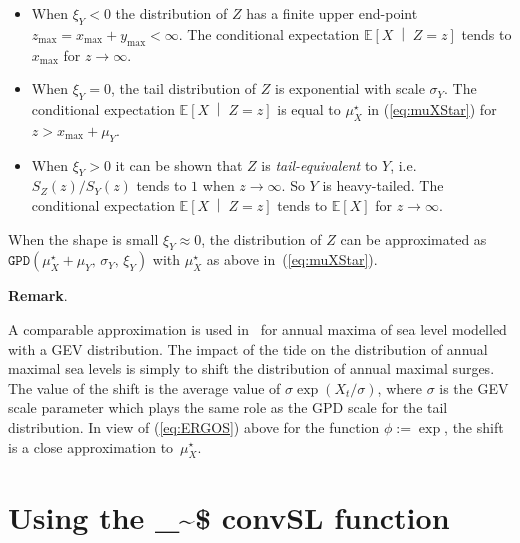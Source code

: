 \documentclass[11pt,a4paper]{report}\usepackage[]{graphicx}\usepackage[]{color}
\makeatletter
\newcommand\code{\bgroup\@makeother\_\@makeother\~\@makeother\$\@codex}
\def\@codex#1{{\normalfont\ttfamily\hyphenchar\font=-1 #1}\egroup}
\newcommand{\Esp}{\mathbb{E}}
\newcommand{\bCond}[2]{\left[ #1 \;\middle\vert\; #2 \right]}
\newcommand{\Up}[1]{#1_{\mathrm{max}}}
\newenvironment{remark}
   {\medskip \par \noindent%
    \small\textbf{Remark}.%
   }%
   {\par \noindent}
\makeatother
\begin{document}
\begin{itemize}

\item When $\xi_Y<0$ the distribution of $Z$ has a finite upper end-point
  $\Up{z} = \Up{x} + \Up{y} < \infty$. The conditional expectation 
  $\Esp\bCond{X}{Z=z}$ tends to $\Up{x}$ for $z \to \infty$.

\item When $\xi_Y = 0$, the tail distribution of $Z$ is exponential
  with scale $\sigma_Y$. The conditional expectation
  $\Esp\bCond{X}{Z=z}$ is equal to $\mu_X^\star$ in (\ref{eq:muXStar})
  for $z > \Up{x} + \mu_Y$.

\item When $\xi_Y>0$ it can be shown that $Z$ is
  \textit{tail-equivalent} to $Y$, i.e.  $S_Z(z) / S_Y(z)$ tends to
  $1$ when $z \to \infty$. So $Y$ is heavy-tailed. The conditional
  expectation $\Esp\bCond{X}{Z=z}$ tends to $\Esp[X]$ for $z \to
  \infty$.
  
  
\end{itemize}

When the shape is small $\xi_Y \approx 0$, the distribution of $Z$ can
be approximated as $\texttt{GPD}(\mu_X^\star +
\mu_Y,\,\sigma_Y,\,\xi_Y)$ with $\mu_X^\star$ as above
in~(\ref{eq:muXStar}).

\begin{remark}
  A comparable approximation is used in~\cite{ColesCoastalFlood} for
  annual maxima of sea level modelled with a GEV distribution. The
  impact of the tide on the distribution of annual maximal sea levels
  is simply to shift the distribution of annual maximal surges. The
  value of the shift is the average value of $\sigma
  \exp(X_t/\sigma)$, where $\sigma$ is the GEV scale parameter which
  plays the same role as the GPD scale for the tail distribution. In
  view of (\ref{eq:ERGOS}) above for the function $\phi := \exp$, the
  shift is a close approximation to~$\mu_X^\star$.
  

\end{remark}



\chapter{Using the \code{convSL} function}
\end{document}
